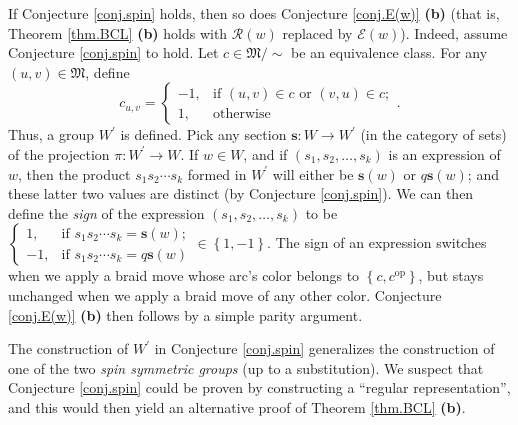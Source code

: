 \documentclass
[numbers=enddot,12pt,final,onecolumn,notitlepage,abstracton]{scrartcl}%
\theoremstyle{definition}
\begin{document}
If Conjecture \ref{conj.spin} holds, then so does Conjecture \ref{conj.E(w)}
\textbf{(b)} (that is, Theorem \ref{thm.BCL} \textbf{(b)} holds with
$\mathcal{R}\left(  w\right)  $ replaced by $\mathcal{E}\left(  w\right)  $).
Indeed, assume Conjecture \ref{conj.spin} to hold. Let $c\in\mathfrak{M}/\sim$
be an equivalence class. For any $\left(  u,v\right)  \in\mathfrak{M}$, define%
\[
c_{u,v}=%
\begin{cases}
-1, & \text{if }\left(  u,v\right)  \in c\text{ or }\left(  v,u\right)  \in
c;\\
1, & \text{otherwise}%
\end{cases}
.
\]
Thus, a group $W^{\prime}$ is defined. Pick any section $\mathbf{s}%
:W\rightarrow W^{\prime}$ (in the category of sets) of the projection
$\pi:W^{\prime}\rightarrow W$. If $w\in W$, and if $\left(  s_{1},s_{2}%
,\ldots,s_{k}\right)  $ is an expression of $w$, then the product $s_{1}%
s_{2}\cdots s_{k}$ formed in $W^{\prime}$ will either be $\mathbf{s}\left(
w\right)  $ or $q\mathbf{s}\left(  w\right)  $; and these latter two values
are distinct (by Conjecture \ref{conj.spin}). We can then define the
\emph{sign} of the expression $\left(  s_{1},s_{2},\ldots,s_{k}\right)  $ to
be $%
\begin{cases}
1, & \text{if }s_{1}s_{2}\cdots s_{k}=\mathbf{s}\left(  w\right)  ;\\
-1, & \text{if }s_{1}s_{2}\cdots s_{k}=q\mathbf{s}\left(  w\right)
\end{cases}
\in\left\{  1,-1\right\}  $. The sign of an expression switches when we apply
a braid move whose arc's color belongs to $\left\{  c,c^{\operatorname*{op}%
}\right\}  $, but stays unchanged when we apply a braid move of any other
color. Conjecture \ref{conj.E(w)} \textbf{(b)} then follows by a simple parity argument.

The construction of $W^{\prime}$ in Conjecture \ref{conj.spin} generalizes the
construction of one of the two \emph{spin symmetric groups} (up to a
substitution). We suspect that Conjecture \ref{conj.spin} could be proven by
constructing a \textquotedblleft regular representation\textquotedblright, and
this would then yield an alternative proof of Theorem \ref{thm.BCL}
\textbf{(b)}.
\end{document}

